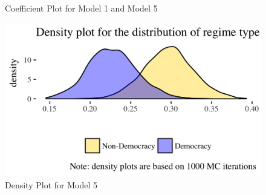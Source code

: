 \documentclass [12pt] {article}
\begin{document}
\begin{figure}
\centering
\caption{Coefficient Plot for Model 1 and Model 5}
\label{cof1}
\end{figure}



\begin{figure}
\centering
\caption{Density Plot for Model 5}
\label{cof2}
\includegraphics[scale =.5]{images/m2_density.png}
\end{figure}



\end{document}
